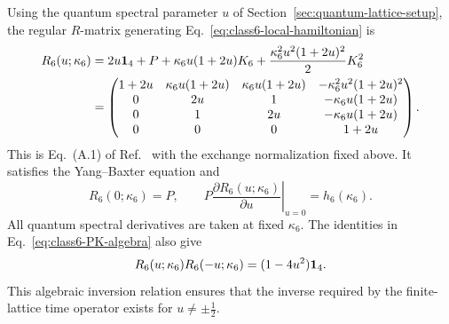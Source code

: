 Using the quantum spectral parameter $u$ of
Section~\ref{sec:quantum-lattice-setup}, the regular $R$-matrix generating
Eq.~\eqref{eq:class6-local-hamiltonian} is
\begin{align}
R_6(u;\kappa_6)
&=2u\mathbf{1}_4+P+\kappa_6 u(1+2u)K_6
+\frac{\kappa_6^2u^2(1+2u)^2}{2}K_6^2
\label{eq:class6-R-polynomial}\\
&=
\begin{pmatrix}
1+2u&\kappa_6u(1+2u)&\kappa_6u(1+2u)&-\kappa_6^2u^2(1+2u)^2\\
0&2u&1&-\kappa_6u(1+2u)\\
0&1&2u&-\kappa_6u(1+2u)\\
0&0&0&1+2u
\end{pmatrix}.
\label{eq:class6-R-matrix}
\end{align}
This is Eq.~(A.1) of Ref.~\cite{deLeeuwFontanellaNietoGarcia2026} with the
exchange normalization fixed above.  It satisfies the Yang--Baxter
equation and
\begin{equation}
R_6(0;\kappa_6)=P,
\qquad
P\left.\frac{\partial R_6(u;\kappa_6)}{\partial u}\right|_{u=0}
=h_6(\kappa_6).
\label{eq:class6-R-regularity-hamiltonian}
\end{equation}
All quantum spectral derivatives are taken at fixed $\kappa_6$.
The identities in Eq.~\eqref{eq:class6-PK-algebra} also give
\begin{equation}
R_6(u;\kappa_6)R_6(-u;\kappa_6)
=(1-4u^2)\mathbf{1}_4.
\label{eq:class6-R-inverse-relation}
\end{equation}
This algebraic inversion relation ensures that the inverse required by
the finite-lattice time operator exists for $u\neq\pm\tfrac12$.

